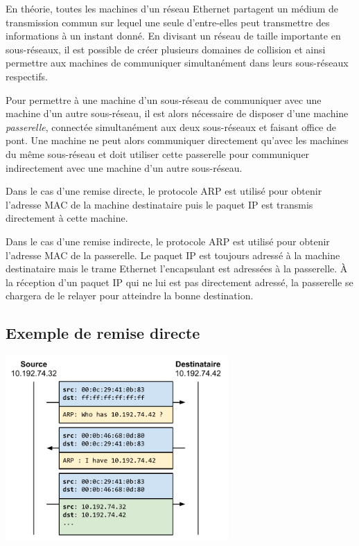 \documentclass[11pt,a4paper]{article}
\begin{document}
En théorie, toutes les machines d'un réseau Ethernet partagent un médium de transmission commun sur lequel une seule d'entre-elles peut transmettre des informations à un instant donné. En divisant un réseau de taille importante en sous-réseaux, il est possible de créer plusieurs domaines de collision et ainsi permettre aux machines de communiquer simultanément dans leurs sous-réseaux respectifs.

Pour permettre à une machine d'un sous-réseau de communiquer avec une machine d'un autre sous-réseau, il est alors nécessaire de disposer d'une machine \textit{passerelle}, connectée simultanément aux deux sous-réseaux et faisant office de pont. Une machine ne peut alors communiquer directement qu'avec les machines du même sous-réseau et doit utiliser cette passerelle pour communiquer indirectement avec une machine d'un autre sous-réseau.

Dans le cas d'une remise directe, le protocole ARP est utilisé pour obtenir l'adresse MAC de la machine destinataire puis le paquet IP est transmis directement à cette machine.

Dans le cas d'une remise indirecte, le protocole ARP est utilisé pour obtenir l'adresse MAC de la passerelle. Le paquet IP est toujours adressé à la machine destinataire mais le trame Ethernet l'encapsulant est adressées à la passerelle. À la réception d'un paquet IP qui ne lui est pas directement adressé, la passerelle se chargera de le relayer pour atteindre la bonne destination.

\subsection{Exemple de remise directe}

\begin{center}
\includegraphics[width=8.5cm]{img_direct}
\end{center}
\end{document}
